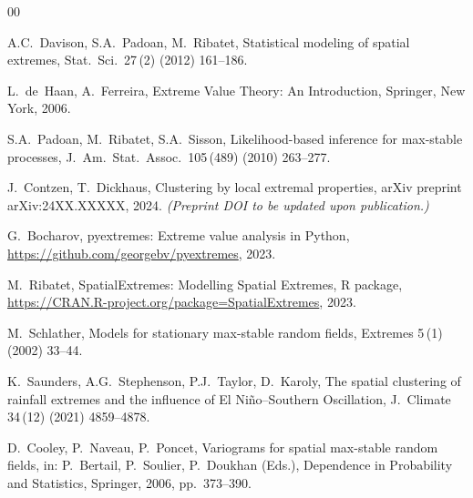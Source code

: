 \documentclass[preprint,12pt,a4paper]{elsarticle}
\begin{document}
\begin{thebibliography}{00}

A.C.~Davison, S.A.~Padoan, M.~Ribatet,
Statistical modeling of spatial extremes,
Stat.\ Sci.\ 27\,(2) (2012) 161--186.

L.~de~Haan, A.~Ferreira,
Extreme Value Theory: An Introduction,
Springer, New York, 2006.

S.A.~Padoan, M.~Ribatet, S.A.~Sisson,
Likelihood-based inference for max-stable processes,
J.\ Am.\ Stat.\ Assoc.\ 105\,(489) (2010) 263--277.

J.~Contzen, T.~Dickhaus,
Clustering by local extremal properties,
arXiv preprint arXiv:24XX.XXXXX, 2024.
\textit{(Preprint DOI to be updated upon publication.)}

G.~Bocharov,
pyextremes: Extreme value analysis in Python,
\url{https://github.com/georgebv/pyextremes}, 2023.

M.~Ribatet,
SpatialExtremes: Modelling Spatial Extremes,
R package, \url{https://CRAN.R-project.org/package=SpatialExtremes}, 2023.

M.~Schlather,
Models for stationary max-stable random fields,
Extremes 5\,(1) (2002) 33--44.

K.~Saunders, A.G.~Stephenson, P.J.~Taylor, D.~Karoly,
The spatial clustering of rainfall extremes and the influence of
El Ni\~{n}o--Southern Oscillation,
J.\ Climate 34\,(12) (2021) 4859--4878.

D.~Cooley, P.~Naveau, P.~Poncet,
Variograms for spatial max-stable random fields,
in: P.~Bertail, P.~Soulier, P.~Doukhan (Eds.),
Dependence in Probability and Statistics,
Springer, 2006, pp.~373--390.

\end{thebibliography}
\end{document}
